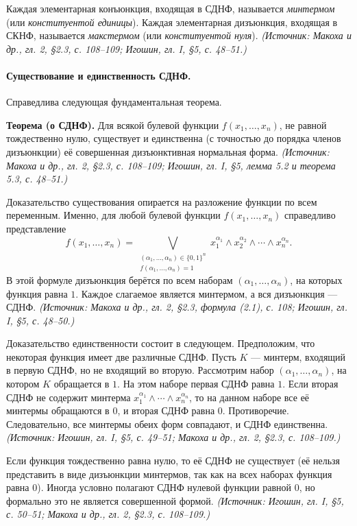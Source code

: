 \documentclass[a4paper,12pt]{article}
\begin{document}
Каждая элементарная конъюнкция, входящая в СДНФ, называется \emph{минтермом} (или \emph{конституентой единицы}). Каждая элементарная дизъюнкция, входящая в СКНФ, называется \emph{макстермом} (или \emph{конституентой нуля}).
\textit{(Источник: Макоха и др., гл. 2, §2.3, с. 108--109; Игошин, гл. I, §5, с. 48--51.)}

\paragraph{Существование и единственность СДНФ.}
Справедлива следующая фундаментальная теорема.

\textbf{Теорема (о СДНФ).} Для всякой булевой функции \(f(x_1,\ldots,x_n)\), не равной тождественно нулю, существует и единственна (с точностью до порядка членов дизъюнкции) её совершенная дизъюнктивная нормальная форма.
\textit{(Источник: Макоха и др., гл. 2, §2.3, с. 108--109; Игошин, гл. I, §5, лемма 5.2 и теорема 5.3, с. 48--51.)}

Доказательство существования опирается на разложение функции по всем переменным. Именно, для любой булевой функции \(f(x_1,\ldots,x_n)\) справедливо представление
\[
f(x_1,\ldots,x_n)
=
\bigvee_{\substack{(\alpha_1,\ldots,\alpha_n)\in\{0,1\}^n\\ f(\alpha_1,\ldots,\alpha_n)=1}}
x_1^{\alpha_1}\land x_2^{\alpha_2}\land\cdots\land x_n^{\alpha_n}.
\tag{2.1}
\]
В этой формуле дизъюнкция берётся по всем наборам \((\alpha_1,\ldots,\alpha_n)\), на которых функция равна \(1\). Каждое слагаемое является минтермом, а вся дизъюнкция — СДНФ.
\textit{(Источник: Макоха и др., гл. 2, §2.3, формула (2.1), с. 108; Игошин, гл. I, §5, с. 48--50.)}

Доказательство единственности состоит в следующем. Предположим, что некоторая функция имеет две различные СДНФ. Пусть \(K\) — минтерм, входящий в первую СДНФ, но не входящий во вторую. Рассмотрим набор \((\alpha_1,\ldots,\alpha_n)\), на котором \(K\) обращается в \(1\). На этом наборе первая СДНФ равна \(1\). Если вторая СДНФ не содержит минтерма \(x_1^{\alpha_1}\land\cdots\land x_n^{\alpha_n}\), то на данном наборе все её минтермы обращаются в \(0\), и вторая СДНФ равна \(0\). Противоречие. Следовательно, все минтермы обеих форм совпадают, и СДНФ единственна.
\textit{(Источник: Игошин, гл. I, §5, с. 49--51; Макоха и др., гл. 2, §2.3, с. 108--109.)}

Если функция тождественно равна нулю, то её СДНФ не существует (её нельзя представить в виде дизъюнкции минтермов, так как на всех наборах функция равна \(0\)). Иногда условно полагают СДНФ нулевой функции равной \(0\), но формально это не является совершенной формой.
\textit{(Источник: Игошин, гл. I, §5, с. 50--51; Макоха и др., гл. 2, §2.3, с. 108--109.)}
\end{document}
